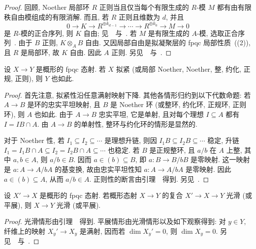 \begin{proof}
回顾, Noether 局部环 $R$ 正则当且仅当每个有限生成的 $R$-模 $M$ 都有由有限秩自由模组成的有限消解. 而且, 若 $R$ 正则且维数为 $d$, 并且
\begin{equation}\label{src:3.1.20}
0\longrightarrow K\longrightarrow R^{\oplus k_{d-1}}
\longrightarrow\cdots\longrightarrow R^{\oplus k_0}
\longrightarrow M\longrightarrow0
\end{equation}
是 $R$-模的正合序列, 则 $K$ 自由; 见~\cite[定理 $19.12$]{Eis95}~与~\cite[Tag 00OC]{SP}.
若 $M$ 是有限生成的 $A$-模, 选取正合序列~. 由于 $B$ 正则, $K\otimes_A B$ 自由. 又因局部自由是拟凝聚层的 fpqc 局部性质~((2)), 且 $R$ 是局部环, 故 $K$ 自由. 因此 $A$ 正则. 另见~\cite[IV0.17.3.3]{EGA}~与~\cite[Tag 00OF]{SP}.
\end{proof}
\begin{proposition}\label{src:3.1.21}
设 $X\to Y$ 是概形的 fpqc 态射. 若 $X$ 拟紧 (或局部 Noether, Noether, 整, 约化, 正规, 正则), 则 $Y$ 也如此.
\end{proposition}
\begin{proof}
首先注意, 拟紧性沿任意满射映射下降. 其他各情形归约到以下代数命题: 若 $A\to B$ 是环的忠实平坦映射, 且 $B$ 是 Noether 环 (或整环, 约化环, 正规环, 正则环), 则 $A$ 也如此. 由于 $A\to B$ 忠实平坦, 它是单射, 且对每个理想 $I\subseteq A$ 都有 $I=IB\cap A$. 由 $A\to B$ 的单射性, 整环与约化环的情形是显然的.

对于 Noether 性, 若 $I_1\subseteq I_2\subseteq\cdots$ 是理想升链, 则因 $I_1B\subseteq I_2B\subseteq\cdots$ 稳定, 升链 $I_1=I_1B\cap A\subseteq I_2=I_2B\cap A\subseteq\cdots$ 也稳定.
若 $B$ 是正规整环, 且 $a/b$ 在 $A$ 上整, 其中 $a,b\in A$, 则 $a/b\in B$. 因而 $a\in(b)\subseteq B$, 即 $a:B\to B/bB$ 是零映射. 这一映射是 $a:A\to A/bA$ 的基变换, 故由忠实平坦性知 $a:A\to A/bA$ 是零映射. 因此 $a\in(b)\subseteq A$, 从而 $a/b\in A$.
正则性的断言由引理~~得到. 另见~\cite[Tags 033D, 034B, 06QL]{SP}.
\end{proof}
\begin{proposition}\label{src:3.1.22}
设 $X'\to X$ 是概形的 fpqc 态射. 若概形态射 $X\to Y$ 的复合 $X'\to X\to Y$ 光滑 (或平展), 则 $X\to Y$ 光滑 (或平展).
\end{proposition}
\begin{proof}
光滑情形由引理~~得到. 平展情形由光滑情形以及如下观察得到: 对 $y\in Y$, 纤维上的映射 $X_y'\to X_y$ 是满射, 因而若 $\dim X_y'=0$, 则 $\dim X_y=0$. 另见~\cite[IV4.17.7.7]{EGA}~与~\cite[Tag 05B5]{SP}.
\end{proof}
